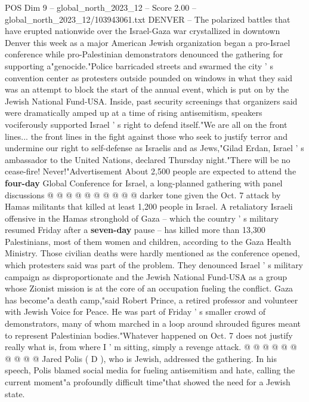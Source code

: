\begin{textsample}{POS Dim 9 – global\_north\_2023\_12 – Score 2.00 – global\_north\_2023\_12/103943061.txt}  \label{ex:f9_pos_168}
DENVER -- The polarized battles that have erupted nationwide over the Israel-Gaza war crystallized in downtown Denver this week as a major American Jewish organization began a pro-Israel conference while pro-Palestinian demonstrators denounced the gathering for supporting a"genocide."Police barricaded streets and swarmed the city ' s convention center as protesters outside pounded on windows in what they said was an attempt to block the start of the annual event, which is put on by the Jewish National Fund-USA.
Inside, past security screenings that organizers said were dramatically amped up at a time of rising antisemitism, speakers vociferously supported Israel ' s right to defend itself."We are all on the front lines... the front lines in the fight against those who seek to justify terror and undermine our right to self-defense as Israelis and as Jews,"Gilad Erdan, Israel ' s ambassador to the United Nations, declared Thursday night."There will be no cease-fire!
Never!"Advertisement About 2,500 people are expected to attend the \textbf{four-day} Global Conference for Israel, a long-planned gathering with panel discussions @ @ @ @ @ @ @ @ @ @ darker tone given the Oct. 7 attack by Hamas militants that killed at least 1,200 people in Israel.
A retaliatory Israeli offensive in the Hamas stronghold of Gaza -- which the country ' s military resumed Friday after a \textbf{seven-day} pause -- has killed more than 13,300 Palestinians, most of them women and children, according to the Gaza Health Ministry.
Those civilian deaths were hardly mentioned as the conference opened, which protesters said was part of the problem.
They denounced Israel ' s military campaign as disproportionate and the Jewish National Fund-USA as a group whose Zionist mission is at the core of an occupation fueling the conflict.
Gaza has become"a death camp,"said Robert Prince, a retired professor and volunteer with Jewish Voice for Peace.
He was part of Friday ' s smaller crowd of demonstrators, many of whom marched in a loop around shrouded figures meant to represent Palestinian bodies."Whatever happened on Oct. 7 does not justify really what is, from where I ' m sitting, simply a revenge attack. @ @ @ @ @ @ @ @ @ @ Jared Polis ( D ), who is Jewish, addressed the gathering.
In his speech, Polis blamed social media for fueling antisemitism and hate, calling the current moment"a profoundly difficult time"that showed the need for a Jewish state.

\end{textsample}
